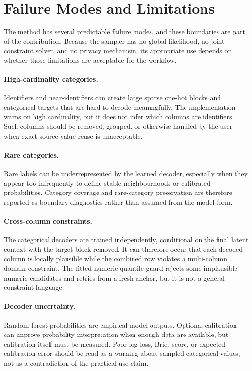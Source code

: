 \section{Failure Modes and Limitations}
\label{sec:failure-modes}

The method has several predictable failure modes, and these boundaries are part
of the contribution. Because the sampler has no global likelihood, no joint
constraint solver, and no privacy mechanism, its appropriate use depends on
whether those limitations are acceptable for the workflow.

\paragraph{High-cardinality categories.}
Identifiers and near-identifiers can create large sparse one-hot blocks and
categorical targets that are hard to decode meaningfully. The implementation
warns on high cardinality, but it does not infer which columns are identifiers.
Such columns should be removed, grouped, or otherwise handled by the user when
exact source-value reuse is unacceptable.

\paragraph{Rare categories.}
Rare labels can be underrepresented by the learned decoder, especially when
they appear too infrequently to define stable neighbourhoods or calibrated
probabilities. Category coverage and rare-category preservation are therefore
reported as boundary diagnostics rather than assumed from the model form.

\paragraph{Cross-column constraints.}
The categorical decoders are trained independently, conditional on the final
latent context with the target block removed. It can therefore occur that each
decoded column is locally plausible while the combined row violates a
multi-column domain constraint. The fitted numeric quantile guard rejects some
implausible numeric candidates and retries from a fresh anchor, but it is not a
general constraint language.

\paragraph{Decoder uncertainty.}
Random-forest probabilities are empirical model outputs. Optional calibration
can improve probability interpretation when enough data are available, but
calibration itself must be measured. Poor log loss, Brier score, or expected
calibration error should be read as a warning about sampled categorical values,
not as a contradiction of the practical-use claim.

